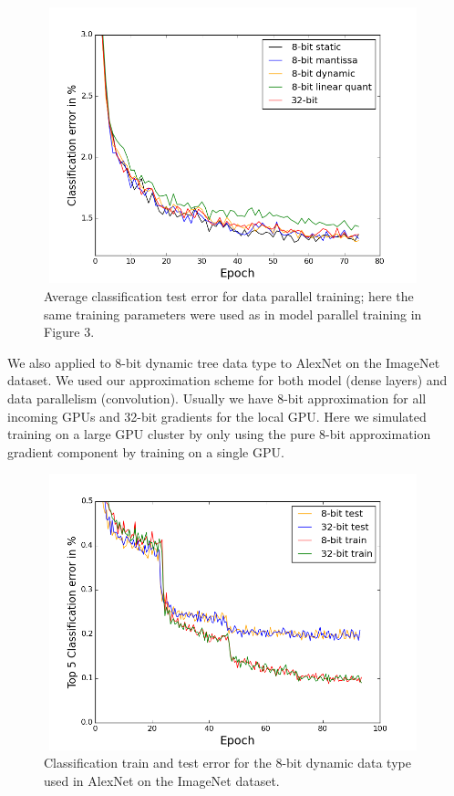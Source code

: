 \documentclass{article} %
\begin{document}
\begin{figure}[htbp]
	\centering
	\includegraphics[width=11cm, height=8cm]{model_parallel.png}
	\caption{Average classification test error for data parallel training; here the same training parameters were used as in model parallel training in Figure 3.}
	\label{fig:untitled}
\end{figure}

We also applied to 8-bit dynamic tree data type to AlexNet on the ImageNet dataset. We used our approximation scheme for both model (dense layers) and data parallelism (convolution). Usually we have 8-bit approximation for all incoming GPUs and 32-bit gradients for the local GPU. Here we simulated training on a large GPU cluster by only using the pure 8-bit approximation gradient component by training on a single GPU. 

\begin{figure}[htbp]
	\centering
	\includegraphics[width=11cm, height=8cm]{imagenet_32vs8.png}
	\caption{Classification train and test error for the 8-bit dynamic data type used in AlexNet on the ImageNet dataset.}
	\label{fig:untitled}
\end{figure}
\end{document}
